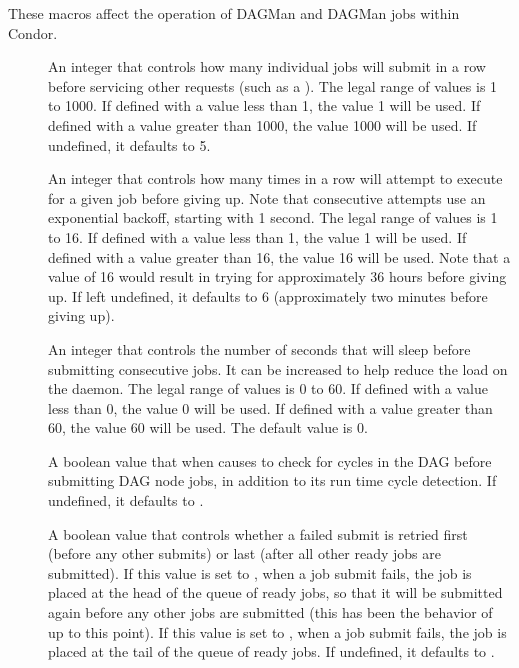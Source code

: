 These macros affect the operation of DAGMan and DAGMan
jobs within Condor.

\begin{description}
\item[]
\label{param:DAGManMaxSubmitsPerInterval}
An integer that controls how many individual jobs
 will submit in a row
before servicing other requests (such as a ).
The legal range of values is 1 to 1000.
If defined with a value less than 1, the  value 1 will be used.
If defined with a value greater than 1000, the value 1000 will be used.
If undefined, it defaults to 5.

\item[]
\label{param:DAGManMaxSubmitAttempts}
An integer that controls how
many times in a row  will attempt to execute
 for a given job before giving up.
Note that consecutive attempts use an exponential backoff,
starting with 1 second.
The legal range of values is 1 to 16.
If defined with a value less than 1, the  value 1 will be used.
If defined with a value greater than 16, the value 16 will be used.
Note that a value of 16 would result in  trying for
approximately 36 hours before giving up.
If left undefined,
it defaults to 6 (approximately two minutes before giving up).

\item[]
\label{param:DAGManSubmitDelay}
An integer that controls the number of seconds
that  will sleep before submitting consecutive jobs.
It can be increased to help reduce the load on the  daemon.
The legal range of values is 0 to 60.
If defined with a value less than 0, the  value 0 will be used.
If defined with a value greater than 60, the value 60 will be used.
The default value is 0.

\item[]
\label{param:DAGManStartupCycleDetect}
A boolean value that when 
causes  to check for cycles in the DAG before
submitting DAG node jobs,
in addition to its run time cycle detection.
If undefined, it defaults to .

\item[]
\label{param:DAGManRetrySubmitFirst}
A boolean value that controls whether a failed submit is retried first
(before any other submits) or last (after all other ready jobs are
submitted).  If this value is set to , when a job submit
fails, the job is placed at the head of the queue of ready jobs, so
that it will be submitted again before any other jobs are submitted
(this has been the behavior of  up to this point).
If this value is set to , when a job submit fails, the job
is placed at the tail of the queue of ready jobs.
If undefined, it defaults to .


\end{description}
